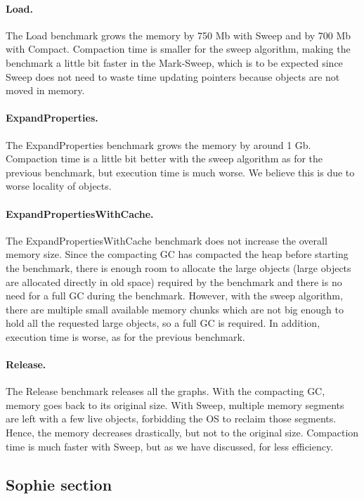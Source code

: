 \documentclass[10pt, sigplan]{acmart}
\begin{document}
\paragraph{Load.} The Load benchmark grows the memory by 750 Mb with Sweep and by 700 Mb with Compact. Compaction time is smaller for the sweep algorithm, making the benchmark a little bit faster in the Mark-Sweep, which is to be expected since Sweep does not need to waste time updating pointers because objects are not moved in memory.

\paragraph{ExpandProperties.} The ExpandProperties benchmark grows the memory by around 1 Gb. Compaction time is a little bit better with the sweep algorithm as for the previous benchmark, but execution time is much worse. We believe this is due to worse locality of objects.

\paragraph{ExpandPropertiesWithCache.} The ExpandPropertiesWithCache benchmark does not increase the overall memory size. Since the compacting GC has compacted the heap before starting the benchmark, there is enough room to allocate the large objects (large objects are allocated directly in old space) required by the benchmark and there is no need for a full GC during the benchmark. However, with the sweep algorithm, there are multiple small available memory chunks which are not big enough to hold all the requested large objects, so a full GC is required. In addition, execution time is worse, as for the previous benchmark.

\paragraph{Release.} The Release benchmark releases all the graphs. With the compacting GC, memory goes back to its original size. With Sweep, multiple memory segments are left with a few live objects, forbidding the OS to reclaim those segments. Hence, the memory decreases drastically, but not to the original size. Compaction time is much faster with Sweep, but as we have discussed, for less efficiency.

\subsection{Sophie section}
\end{document}

